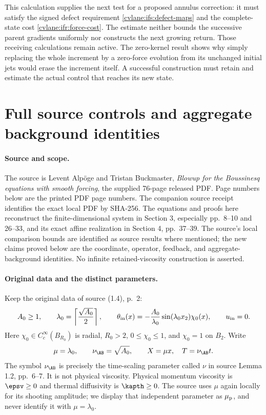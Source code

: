 This calculation supplies the next test for a proposed annulus
correction: it must satisfy the signed defect requirement
\eqref{cvlane:ifs:defect-maps} and the complete-state cost
\eqref{cvlane:ifr:force-cost}.  The estimate neither bounds the successive
parent gradients uniformly nor constructs the next growing return.
Those receiving calculations remain active.  The zero-kernel result
shows why simply replacing the whole increment by a zero-force
evolution from its unchanged initial jets would erase the increment
itself.  A successful construction must retain and estimate the actual
control that reaches its new state.


\section{Full source controls and aggregate background identities}
\paragraph{Source and scope.}
The source is Levent Alp\"oge and Tristan Buckmaster, \emph{Blowup for the Boussinesq equations with smooth forcing}, the supplied 76-page released PDF. Page numbers below are the printed PDF page numbers. The companion source receipt identifies the exact local PDF by SHA-256. The equations and proofs here reconstruct the finite-dimensional system in Section 3, especially pp.~8--10 and 26--33, and its exact affine realization in Section 4, pp.~37--39. The source's local comparison bounds are identified as source results where mentioned; the new claims proved below are the coordinate, operator, feedback, and aggregate-background identities. No infinite retained-viscosity construction is asserted.

\paragraph{Original data and the distinct parameters.}
Keep the original data of source (1.4), p.~2:
\[
 A_0\ge1,\qquad \lambda_0=\left\lceil\frac{\sqrt{A_0}}2\right\rceil,
 \qquad \theta_{\rm in}(x)=-\frac{A_0}{\lambda_0}\sin(\lambda_0x_2)\chi_0(x),
 \qquad u_{\rm in}=0.
\]
Here $\chi_0\in C_c^\infty(B_{R_0})$ is radial, $R_0>2$, $0\le\chi_0\le1$, and $\chi_0=1$ on $B_2$. Write
\[
 \mu=\lambda_0,\qquad \nu_{\AB}=\sqrt{A_0},\qquad X=\mu x,\quad T=\nu_{\AB}t.
\]
The symbol $\nu_{\AB}$ is precisely the time-scaling parameter called $\nu$ in source Lemma 1.2, pp.~6--7. It is not physical viscosity. Physical momentum viscosity is $\epsv\ge0$ and thermal diffusivity is $\kapth\ge0$. The source uses $\mu$ again locally for its shooting amplitude; we display that independent parameter as $\mu_{\rm p}$, and never identify it with $\mu=\lambda_0$.

